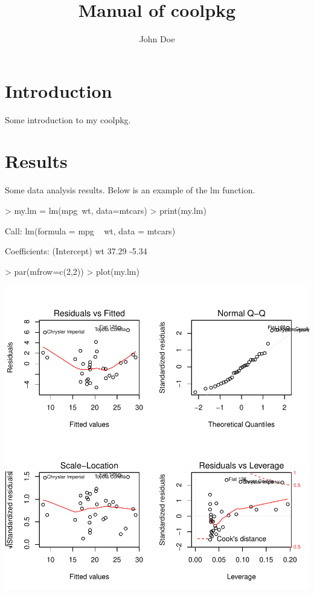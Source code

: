 \documentclass{article}
\title{Manual of coolpkg}
\author{John Doe}
\begin{document}

\maketitle
\section{Introduction}
Some introduction to my coolpkg.
\section{Results}
Some data analysis results. Below is an example of the lm function.
\begin{Schunk}
\begin{Sinput}
> my.lm = lm(mpg~wt, data=mtcars)
> print(my.lm)
\end{Sinput}
\begin{Soutput}
Call:
lm(formula = mpg ~ wt, data = mtcars)

Coefficients:
(Intercept)           wt  
      37.29        -5.34  
\end{Soutput}
\end{Schunk}
\begin{Schunk}
\begin{Sinput}
> par(mfrow=c(2,2))
> plot(my.lm)
\end{Sinput}
\end{Schunk}
\includegraphics{examp2-002}
\end{document}
